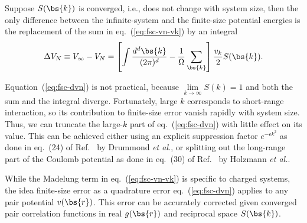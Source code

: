 Suppose $S(\bs{k})$ is converged, i.e., does not change with system size, then the only difference between the infinite-system and the finite-size potential energies is the replacement of the sum in eq.~(\ref{eq:fsc-vn-vk}) by an integral
\begin{align} \label{eq:fsc-dvn}
\Delta V_N \equiv V_{\infty} - V_N = \left[
\int \dfrac{d^d\bs{k}}{(2\pi)^d} - \dfrac{1}{\Omega}\sum\limits_{\bs{k}}
\right] \frac{v_k}{2} S(\bs{k}).
\end{align}

Equation~(\ref{eq:fsc-dvn}) is not practical, because $\lim\limits_{k\rightarrow\infty}S(k)=1$ and both the sum and the integral diverge. Fortunately, large $k$ corresponds to short-range interaction, so its contribution to finite-size error vanish rapidly with system size. Thus, we can truncate the large-$k$ part of eq.~(\ref{eq:fsc-dvn}) with little effect on its value. This can be achieved either using an explicit suppression factor $e^{-\epsilon k^2}$ as done in eq.~(24) of Ref.~\cite{Drummond2008} by Drummond \textit{et al.}, or splitting out the long-range part of the Coulomb potential as done in eq.~(30) of Ref.~\cite{Holzmann2016} by Holzmann \textit{et al.}.

While the Madelung term in eq.~(\ref{eq:fsc-vn-vk}) is specific to charged systems, the idea finite-size error as a quadrature error eq.~(\ref{eq:fsc-dvn}) applies to any pair potential $v(\bs{r})$. This error can be accurately corrected given converged pair correlation functions in real $g(\bs{r})$ and reciprocal space $S(\bs{k})$.

